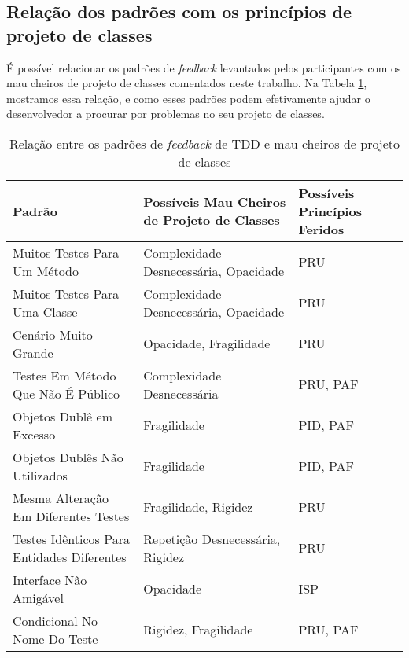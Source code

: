 \documentclass[conference]{IEEEtran}
\begin{document}
\subsection{Relação dos padrões com os princípios de projeto de classes}

É possível relacionar os padrões de \textit{feedback} levantados pelos participantes
com os mau cheiros de projeto de classes comentados neste trabalho. 
Na Tabela \ref{tab:relacao-padroes},
mostramos essa relação, e como esses padrões podem efetivamente ajudar o desenvolvedor
a procurar por problemas no seu projeto de classes.


\begin{table}[h!]
	\centering
	\begin{tabular}{| p{2.5cm} | p{2.5cm} | p{2cm} | }
		\hline

		\textbf{Padrão} & \textbf{Possíveis Mau Cheiros de Projeto de Classes} & \textbf{Possíveis Princípios Feridos}\\
		
		\hline

		Muitos Testes Para Um Método                   & Complexidade Desnecessária, Opacidade   & PRU \\ \hline
		Muitos Testes Para Uma Classe                  & Complexidade Desnecessária, Opacidade   & PRU \\ \hline
		Cenário Muito Grande                           & Opacidade, Fragilidade                  & PRU \\ \hline
		Testes Em Método Que Não É Público             & Complexidade Desnecessária              & PRU, PAF \\ \hline
		Objetos Dublê em Excesso                       & Fragilidade                             & PID, PAF \\ \hline
		Objetos Dublês Não Utilizados                  & Fragilidade                             & PID, PAF \\ \hline
		Mesma Alteração Em Diferentes Testes           & Fragilidade, Rigidez                    & PRU \\ \hline
		Testes Idênticos Para Entidades Diferentes     & Repetição Desnecessária, Rigidez        & PRU  \\ \hline
		Interface Não Amigável                         & Opacidade                               & ISP \\ \hline
		Condicional No Nome Do Teste                   & Rigidez, Fragilidade                    & PRU, PAF \\

		\hline
		
	\end{tabular}
	\caption{Relação entre os padrões de \textit{feedback} de TDD e mau cheiros de projeto de classes}
	\label{tab:relacao-padroes}
\end{table}
\end{document}
